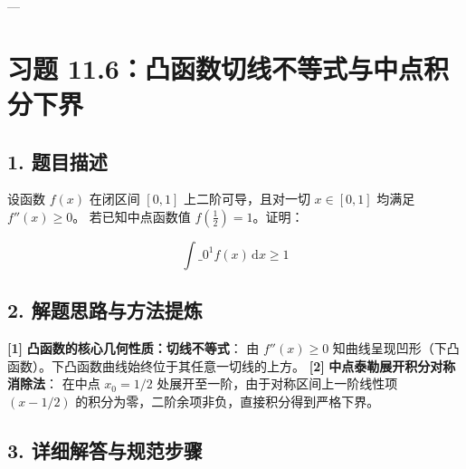 \documentclass[11pt,a4paper,UTF8]{ctexart}
\begin{document}
---


\section{习题 11.6：凸函数切线不等式与中点积分下界}


\subsection{1. 题目描述}
设函数 $f(x)$ 在闭区间 $[0, 1]$ 上二阶可导，且对一切 $x \in [0, 1]$ 均满足 $f''(x) \ge 0$。
若已知中点函数值 $f\left(\frac{1}{2}\right) = 1$。证明：

\begin{equation*}
\int\_0^1 f(x)\,\mathrm{d}x \ge 1
\end{equation*}



\subsection{2. 解题思路与方法提炼}
\begin{solbox}[分步推导与答题规范]
\textbf{[1]}  \textbf{凸函数的核心几何性质：切线不等式}：
由 $f''(x) \ge 0$ 知曲线呈现凹形（下凸函数）。下凸函数曲线始终位于其任意一切线的上方。
\textbf{[2]}  \textbf{中点泰勒展开积分对称消除法}：
在中点 $x_0 = 1/2$ 处展开至一阶，由于对称区间上一阶线性项 $(x - 1/2)$ 的积分为零，二阶余项非负，直接积分得到严格下界。
\end{solbox}


\subsection{3. 详细解答与规范步骤}
\end{document}
